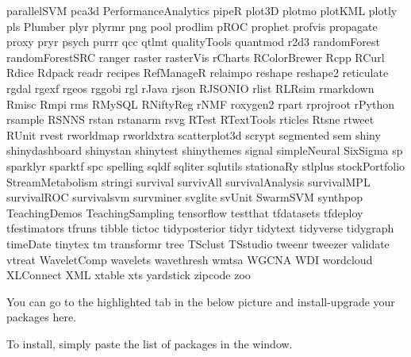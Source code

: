 \documentclass[11pt]{article} %
\begin{document}
\begin{itemize}
      parallelSVM
      pca3d    
      PerformanceAnalytics
      pipeR 
      plot3D 
      plotmo
      plotKML
      plotly
      pls
      Plumber
      plyr
      plyrmr
      png
      pool
      prodlim
      pROC
      prophet
      profvis
      propagate
      proxy
      pryr
      psych  
      purrr
      qcc 
      qtlmt
      qualityTools   
      quantmod 
      r2d3
      randomForest
      randomForestSRC
      ranger
      raster
      rasterVis
      rCharts
      RColorBrewer 
      Rcpp 
      RCurl
      Rdice
      Rdpack
      readr
      recipes
      RefManageR
      relaimpo
      reshape 
      reshape2 
      reticulate
      rgdal
      rgexf
      rgeos 
      rggobi 
      rgl 
      rJava 
      rjson
      RJSONIO 
      rlist 
      RLRsim
      rmarkdown 
      Rmisc
      Rmpi
      rms
      RMySQL 
      RNiftyReg   
      rNMF 
      roxygen2 
      rpart 
      rprojroot
      rPython 
      rsample
      RSNNS
      rstan
      rstanarm
      rsvg
      RTest
      RTextTools
      rticles
      Rtsne
      rtweet
      RUnit
      rvest   
      rworldmap
      rworldxtra
      scatterplot3d  
      scrypt 
      segmented 
      sem 
      shiny
      shinydashboard
      shinystan
      shinytest
      shinythemes
      signal
      simpleNeural
      SixSigma  
      sp 
      sparklyr
      sparktf
      spc 
      spelling
      sqldf  
      sqliter
      sqlutils 
      stationaRy 
      stlplus
      stockPortfolio 
      StreamMetabolism
      stringi
      survival
      survivAll 
      survivalAnalysis 
      survivalMPL 
      survivalROC 
      survivalsvm
      survminer 
      svglite
      svUnit
      SwarmSVM
      synthpop
      TeachingDemos
      TeachingSampling
      tensorflow
      testthat
      tfdatasets
      tfdeploy
      tfestimators
      tfruns 
      tibble
      tictoc
      tidyposterior
      tidyr 
      tidytext
      tidyverse
      tidygraph
      timeDate
      tinytex
      tm
      transformr
      tree 
      TSclust
      TSstudio
      tweenr
      tweezer
      validate
      vtreat
      WaveletComp
      wavelets
      wavethresh
      wmtsa
      WGCNA
      WDI 
      wordcloud 
      XLConnect  
      XML 
      xtable
      xts 
      yardstick
      zipcode
      zoo 
    
    	You can go to the highlighted tab in the below picture and install-upgrade your packages here. 
      
      To install, simply paste the list of packages in the window. 
    

\end{itemize}
\end{document}
